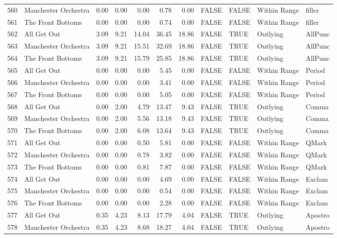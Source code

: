 \begin{table}[ht]
\begin{tabular}{rlrrrrrllll}
  560 & Manchester Orchestra & 0.00 & 0.00 & 0.00 & 0.78 & 0.00 & FALSE & FALSE & Within Range & filler \\ 
  561 & The Front Bottoms & 0.00 & 0.00 & 0.00 & 0.74 & 0.00 & FALSE & FALSE & Within Range & filler \\ 
  562 & All Get Out & 3.09 & 9.21 & 14.04 & 36.45 & 18.86 & FALSE & TRUE & Outlying & AllPunc \\ 
  563 & Manchester Orchestra & 3.09 & 9.21 & 15.51 & 32.69 & 18.86 & FALSE & TRUE & Outlying & AllPunc \\ 
  564 & The Front Bottoms & 3.09 & 9.21 & 15.79 & 25.85 & 18.86 & FALSE & TRUE & Outlying & AllPunc \\ 
  565 & All Get Out & 0.00 & 0.00 & 0.00 & 5.45 & 0.00 & FALSE & FALSE & Within Range & Period \\ 
  566 & Manchester Orchestra & 0.00 & 0.00 & 0.00 & 3.41 & 0.00 & FALSE & FALSE & Within Range & Period \\ 
  567 & The Front Bottoms & 0.00 & 0.00 & 0.00 & 5.05 & 0.00 & FALSE & FALSE & Within Range & Period \\ 
  568 & All Get Out & 0.00 & 2.00 & 4.79 & 13.47 & 9.43 & FALSE & TRUE & Outlying & Comma \\ 
  569 & Manchester Orchestra & 0.00 & 2.00 & 5.56 & 13.18 & 9.43 & FALSE & TRUE & Outlying & Comma \\ 
  570 & The Front Bottoms & 0.00 & 2.00 & 6.08 & 13.64 & 9.43 & FALSE & TRUE & Outlying & Comma \\ 
  571 & All Get Out & 0.00 & 0.00 & 0.50 & 5.81 & 0.00 & FALSE & FALSE & Within Range & QMark \\ 
  572 & Manchester Orchestra & 0.00 & 0.00 & 0.78 & 3.82 & 0.00 & FALSE & FALSE & Within Range & QMark \\ 
  573 & The Front Bottoms & 0.00 & 0.00 & 0.81 & 7.87 & 0.00 & FALSE & FALSE & Within Range & QMark \\ 
  574 & All Get Out & 0.00 & 0.00 & 0.00 & 4.69 & 0.00 & FALSE & FALSE & Within Range & Exclam \\ 
  575 & Manchester Orchestra & 0.00 & 0.00 & 0.00 & 0.54 & 0.00 & FALSE & FALSE & Within Range & Exclam \\ 
  576 & The Front Bottoms & 0.00 & 0.00 & 0.00 & 2.28 & 0.00 & FALSE & FALSE & Within Range & Exclam \\ 
  577 & All Get Out & 0.35 & 4.23 & 8.13 & 17.79 & 4.04 & FALSE & TRUE & Outlying & Apostro \\ 
  578 & Manchester Orchestra & 0.35 & 4.23 & 8.68 & 18.27 & 4.04 & FALSE & TRUE & Outlying & Apostro \\ 

\end{tabular}
\end{table}
